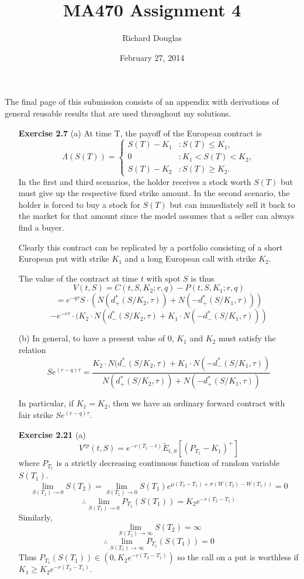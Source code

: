 \documentclass{article}[12pt,a4paper]
\title{MA470 Assignment 4}
\author{Richard Douglas}
\date{February 27,  2014} %
\begin{document}
  \maketitle
  \noindent The final page of this submission consists of an appendix with derivations of general reusable results that 
  are used throughout my solutions.\newline
  \begin{enumerate}
  
  \item[\textbf{Exercise 2.7}]
  (a) At time T, the payoff of the European contract is
  $$\Lambda(S(T)) = \left\{ 
  			\begin{array}{cl}
  			S(T) - K_1 & : S(T) \le K_1, \\
  			0               & : K_1 < S(T) < K_2, \\
  			S(T) - K_2 & : S(T) \ge K_2.
  			\end{array} 
  \right.$$
  In the first and third scenarios, the holder receives a stock worth $S(T)$ but must give up 
  the respective fixed strike amount. In the second scenario, the holder is forced to buy a stock for $S(T)$
  but can immediately sell it back to the market for that amount
  since the model assumes that a seller can always find a buyer.
  
  Clearly this contract can be replicated by a portfolio consisting of a short European put with strike $K_1$ and
  a long European call with strike $K_2$.
  
  The value of the contract at time $t$ with spot $S$ is thus
  $$V(t, S) = C(t, S, K_2; r, q) - P(t, S, K_1; r, q)$$
  $$= e^{-q\tau}S\cdot(N(d_+^*(S/K_2,\tau)) + N(-d_+^*(S/K_1,\tau))) $$
  $$      - e^{-r\tau}\cdot(K_2\cdot N(d_-^*(S/K_2,\tau) + K_1\cdot N(-d_-^*(S/K_1,\tau)))$$
  
  (b) In general, to have a present value of $0$, $K_1$ and $K_2$ must satisfy the relation
  $$Se^{(r - q)\tau} = \frac
  {K_2\cdot N(d_-^*(S/K_2,\tau) + K_1\cdot N(-d_-^*(S/K_1,\tau))}
  {N(d_+^*(S/K_2,\tau)) + N(-d_+^*(S/K_1,\tau))}$$
  
  In particular, if $K_1 = K_2$, then we have an ordinary forward contract with fair strike
  $Se^{(r-q)\tau}$. 
  \pagebreak
  
  
  
  \item[\textbf{Exercise 2.21}]
  (a) 
  $$V^{cp}(t,S) = e^{-r(T_1 - t)}\widetilde{E}_{t, S}\left[ (P_{T_1} - K_1)^{+} \right]$$
  where $P_{T_1}$ is a strictly decreasing continuous function of random variable $S(T_1)$. 
  $$\lim_{S(T_1) \to 0}{S(T_2)} = \lim_{S(T_1) \to 0}{S(T_1)e^{\mu(T_2 - T_1) + \sigma(W(T_2) - W(T_1))}} = 0$$
  $$\therefore \lim_{S(T_1) \to 0}{P_{T_1}(S(T_1))} = K_2e^{-r(T_2 - T_1)}$$
  Similarly,
  $$\lim_{S(T_1) \to \infty}{S(T_2)} = \infty$$
  $$\therefore \lim_{S(T_1) \to \infty}{P_{T_1}(S(T_1))} = 0$$
  Thus $P_{T_1}(S(T_1)) \in (0,  K_2e^{-r(T_2 - T_1)})$ so the call on a put is worthless
  if $K_1 \ge K_2e^{-r(T_2 - T_1)}.$ \newline
  

\end{enumerate}
\end{document}
